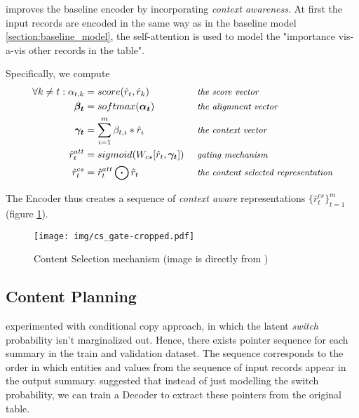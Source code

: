 \citep{puduppully2019datatotext} improves the baseline encoder by incorporating \emph{context awareness}. At first the input records are encoded in the same way as in the baseline model \ref{section:baseline_model}, the self-attention is used to model the "importance vis-a-vis other records in the table".

Specifically, we compute
\begin{align*}
\forall k \neq t : \alpha_{t, k} &= score(\hat{r}_t, \hat{r}_k)                         &&\mbox{ \small \emph{the score vector}}\\
\boldsymbol{\beta_t}             &= softmax(\boldsymbol{\alpha_t})                      &&\mbox{ \small \emph{the alignment vector}}\\
\boldsymbol{\gamma_t}            &= \sum_{i=1}^m{\beta_{t, i} * \hat{r}_i}               &&\mbox{ \small \emph{the context vector}}\\
\hat{r}_t^{att}                  &= sigmoid( W_{cs} [\hat{r}_t, \boldsymbol{\gamma_t}] ) &&\mbox{ \small \emph{gating mechanism}}\\
\hat{r}_t^{cs}                   &= \hat{r}_t^{att} \bigodot \hat{r}_t                  &&\mbox{ \small \emph{the content selected representation}}
\end{align*}

The Encoder thus creates a sequence of \emph{context aware} representations $\{\hat{r}_t^{cs}\}_{t=1}^m$ (figure \ref{content_selection_pudupully}).

\begin{figure}[!h]
    \texttt{[image: img/cs\_gate-cropped.pdf]}
    \caption{Content Selection mechanism (image is directly from \citep{puduppully2019datatotext})} \label{content_selection_pudupully}
\end{figure}

\subsection{Content Planning} \label{subsection:content_planning}

\citep{wiseman2017} experimented with conditional copy approach, in which the latent \emph{switch} probability isn't marginalized out. Hence, there exists pointer sequence for each summary in the train and validation dataset. The sequence corresponds to the order in which entities and values from the sequence of input records appear in the output summary. \citep{puduppully2019datatotext} suggested that instead of just modelling the switch probability, we can train a Decoder to extract these pointers from the original table.

